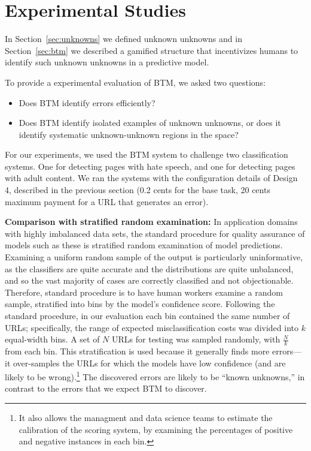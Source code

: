 \section{Experimental Studies}

In Section~\ref{sec:unknowns} we defined unknown unknowns and in Section~\ref{sec:btm} we described a gamified structure that incentivizes humans to identify such unknown unknowns in a predictive model.

To provide a experimental evaluation of BTM, we asked two questions:
\begin{itemize}

\item Does BTM identify errors efficiently?

\item Does BTM identify isolated examples of unknown unknowns, or does it identify systematic unknown-unknown regions in the space?


\end{itemize}

For our experiments, we used the BTM system to challenge two classification systems. One for detecting pages with hate speech, and one for detecting pages with adult content. We ran the systems with the configuration details of Design 4, described in the previous section (0.2 cents for the base task, 20 cents maximum payment for a URL that generates an error).



\textbf{Comparison with stratified random examination:} In  application domains with highly imbalanced data sets, the standard procedure for quality assurance of models such as these is stratified random examination of model predictions. Examining a uniform random sample of the output is particularly uninformative, as the classifiers are quite accurate and the distributions are quite unbalanced, and so the vast majority of cases are correctly classified and not objectionable.  Therefore, standard procedure is to have human workers examine a random sample, stratified into bins by the model's confidence score. Following the standard procedure, in our evaluation each bin contained the same number of URLs; specifically, the range of expected misclassification costs was divided into $k$ equal-width bins.  A set of $N$ URLs for testing was sampled randomly, with $\frac{N}{k}$ from each bin.  This stratification is used because it generally finds more errors---it over-samples the URLs for which the models have low confidence (and are likely to be wrong).\footnote{It also allows the managment and data science teams to estimate the calibration of the scoring system, by examining the percentages of positive and negative instances in each bin.} The discovered errors are likely to be ``known unknowns,'' in contrast to the errors that we expect BTM to discover.

